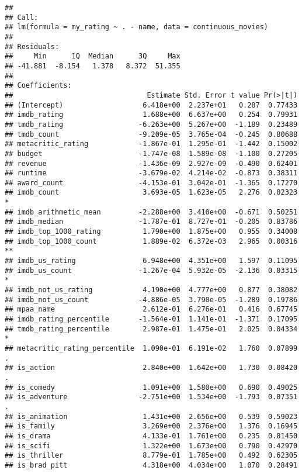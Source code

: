 \documentclass[
]{article}
\begin{document}
\begin{verbatim}
## 
## Call:
## lm(formula = my_rating ~ . - name, data = continuous_movies)
## 
## Residuals:
##     Min      1Q  Median      3Q     Max 
## -41.881  -8.154   1.378   8.372  51.355 
## 
## Coefficients:
##                                Estimate Std. Error t value Pr(>|t|)   
## (Intercept)                   6.418e+00  2.237e+01   0.287  0.77433   
## imdb_rating                   1.688e+00  6.637e+00   0.254  0.79931   
## tmdb_rating                  -6.263e+00  5.267e+00  -1.189  0.23489   
## tmdb_count                   -9.209e-05  3.765e-04  -0.245  0.80688   
## metacritic_rating            -1.867e-01  1.295e-01  -1.442  0.15002   
## budget                       -1.747e-08  1.589e-08  -1.100  0.27205   
## revenue                      -1.436e-09  2.927e-09  -0.490  0.62401   
## runtime                      -3.679e-02  4.214e-02  -0.873  0.38311   
## award_count                  -4.153e-01  3.042e-01  -1.365  0.17270   
## imdb_count                    3.693e-05  1.623e-05   2.276  0.02323 * 
## imdb_arithmetic_mean         -2.288e+00  3.410e+00  -0.671  0.50251   
## imdb_median                  -1.787e-01  8.727e-01  -0.205  0.83786   
## imdb_top_1000_rating          1.790e+00  1.875e+00   0.955  0.34008   
## imdb_top_1000_count           1.889e-02  6.372e-03   2.965  0.00316 **
## imdb_us_rating                6.948e+00  4.351e+00   1.597  0.11095   
## imdb_us_count                -1.267e-04  5.932e-05  -2.136  0.03315 * 
## imdb_not_us_rating            4.190e+00  4.777e+00   0.877  0.38082   
## imdb_not_us_count            -4.886e-05  3.790e-05  -1.289  0.19786   
## mpaa_name                     2.612e-01  6.276e-01   0.416  0.67745   
## imdb_rating_percentile       -1.564e-01  1.141e-01  -1.371  0.17095   
## tmdb_rating_percentile        2.987e-01  1.475e-01   2.025  0.04334 * 
## metacritic_rating_percentile  1.090e-01  6.191e-02   1.760  0.07899 . 
## is_action                     2.840e+00  1.642e+00   1.730  0.08420 . 
## is_comedy                     1.091e+00  1.580e+00   0.690  0.49025   
## is_adventure                 -2.751e+00  1.534e+00  -1.793  0.07351 . 
## is_animation                  1.431e+00  2.656e+00   0.539  0.59023   
## is_family                     3.269e+00  2.376e+00   1.376  0.16945   
## is_drama                      4.133e-01  1.761e+00   0.235  0.81450   
## is_scifi                      1.322e+00  1.673e+00   0.790  0.42970   
## is_thriller                   8.779e-01  1.785e+00   0.492  0.62305   
## is_brad_pitt                  4.318e+00  4.034e+00   1.070  0.28491   

\end{verbatim}
\end{document}

